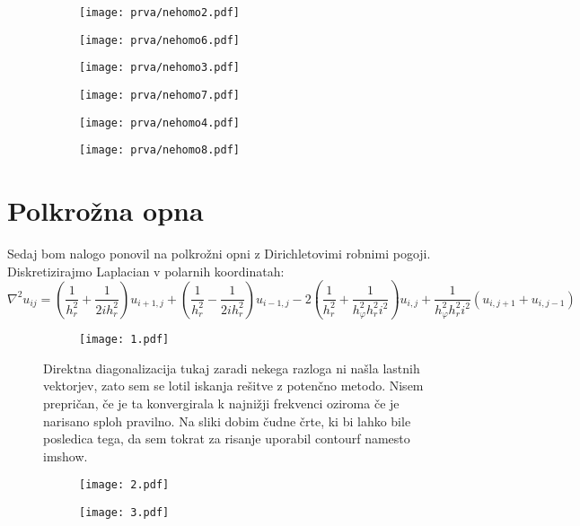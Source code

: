 \documentclass{article}
\begin{document}
\begin{figure}[H]
\centering
\begin{subfigure}{.49\textwidth}
\texttt{[image: prva/nehomo2.pdf]}
\end{subfigure}
\begin{subfigure}{.49\textwidth}
\texttt{[image: prva/nehomo6.pdf]}
\end{subfigure}
\end{figure}

\begin{figure}[H]
\centering
\begin{subfigure}{.49\textwidth}
\texttt{[image: prva/nehomo3.pdf]}
\end{subfigure}
\begin{subfigure}{.49\textwidth}
\texttt{[image: prva/nehomo7.pdf]}
\end{subfigure}
\end{figure}

\begin{figure}[H]
\centering
\begin{subfigure}{.49\textwidth}
\texttt{[image: prva/nehomo4.pdf]}
\end{subfigure}
\begin{subfigure}{.49\textwidth}
\texttt{[image: prva/nehomo8.pdf]}
\end{subfigure}
\end{figure}

\section{Polkrožna opna}

Sedaj bom nalogo ponovil na polkrožni opni z Dirichletovimi robnimi pogoji. Diskretizirajmo Laplacian v polarnih koordinatah:
\begin{equation*}
\nabla^2 u_{ij} = \left(\frac{1}{h_r^2} + \frac{1}{2i h_r^2}\right) u_{i+1,j} + \left(\frac{1}{h_r^2} - \frac{1}{2i h_r^2}\right) u_{i-1,j} - 2\left(\frac{1}{h_r^2} + \frac{1}{h_{\varphi}^2 h_r^2 i^2}\right) u_{i,j} + \frac{1}{h_{\varphi}^2 h_r^2 i^2}\left(u_{i,j+1} + u_{i,j-1} \right)
\end{equation*}

\begin{figure}[H]
\centering
\begin{subfigure}{.7\textwidth}
\texttt{[image: 1.pdf]}
\end{subfigure}
\caption*{Direktna diagonalizacija tukaj zaradi nekega razloga ni našla lastnih vektorjev, zato sem se lotil iskanja rešitve z potenčno metodo. Nisem prepričan, če je ta konvergirala k najnižji frekvenci oziroma če je narisano sploh pravilno. Na sliki dobim čudne črte, ki bi lahko bile posledica tega, da sem tokrat za risanje uporabil contourf namesto imshow.}
\end{figure}

\begin{figure}[H]
\centering
\begin{subfigure}{.7\textwidth}
\texttt{[image: 2.pdf]}
\end{subfigure}
\end{figure}

\begin{figure}[H]
\centering
\begin{subfigure}{.7\textwidth}
\texttt{[image: 3.pdf]}
\end{subfigure}
\end{figure}
\end{document}

